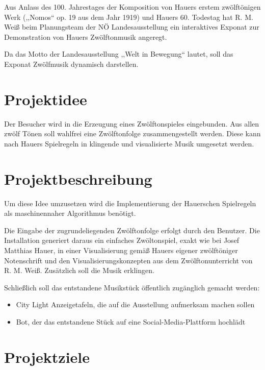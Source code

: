 \documentclass[a4paper]{scrartcl}
\begin{document}
\noindent
Aus Anlass des 100. Jahrestages der Komposition von Hauers erstem zwölftönigen Werk (\mbox{,,Nomos``} op. 19 aus dem Jahr 1919) und Hauers 60. Todestag hat R. M. Weiß beim Planungsteam der NÖ Landesausstellung ein interaktives Exponat zur Demonstration von Hauers Zwölftonmusik angeregt.

\noindent
Da das Motto der Landesausstellung ,,Welt in Bewegung`` lautet, soll das Exponat Zwölfmusik dynamisch darstellen.

\section{Projektidee}
Der Besucher wird in die Erzeugung eines Zwölftonspieles eingebunden.
Aus allen zwölf Tönen soll wahlfrei eine Zwölftonfolge zusammengestellt werden. Diese kann nach Hauers Spielregeln in klingende und visualisierte Musik umgesetzt werden.

\section{Projektbeschreibung}
Um diese Idee umzusetzen wird die Implementierung der Hauerschen Spielregeln als maschinennaher Algorithmus benötigt.

\noindent
Die Eingabe der zugrundeliegenden Zwölftonfolge erfolgt durch den Benutzer. Die Installation generiert daraus ein einfaches Zwöltonspiel, exakt wie bei Josef Matthias Hauer, in einer Visualisierung gemäß Hauers eigener zwölftöniger Notenschrift und den Visualisierungskonzepten aus dem Zwölftonunterricht von R. M. Weiß.
Zusätzlich soll die Musik erklingen.

\noindent
Schließlich soll das entstandene Musikstück öffentlich zugänglich gemacht werden:

\begin{itemize}
\item City Light Anzeigetafeln, die auf die Ausstellung aufmerksam machen sollen
\item Bot, der das entstandene Stück auf eine Social-Media-Plattform hochlädt
\end{itemize}

\section{Projektziele}
\end{document}

